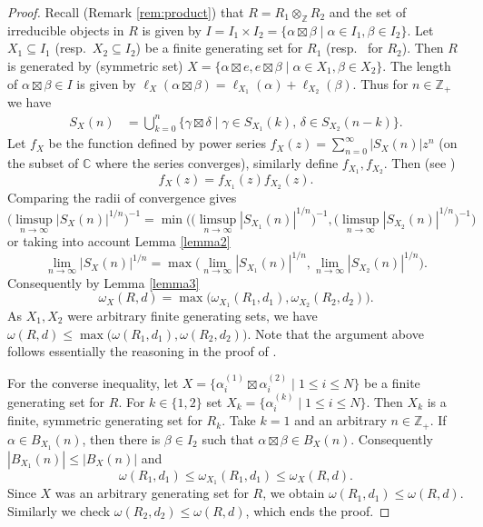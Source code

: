 \documentclass[11 pt, leqno]{amsart}
\newcommand{\CC}{\mathbb{C}}
\newcommand{\ZZ}{\mathbb{Z}}
\theoremstyle{definition}
\numberwithin{equation}{section}
\begin{document}
\begin{proof}
Recall (Remark \ref{rem:product}) that $R=R_1\otimes_{\ZZ} R_2$ and the set of irreducible objects in $R$ is given by $I=I_1\times I_2=\{\alpha\boxtimes \beta\mid \alpha\in I_1,\beta\in I_2\}$. Let $X_1\subseteq I_1$ (resp.~$X_2\subseteq I_2$) be a finite generating set for $R_1$ (resp.~ for $R_2$). Then $R$ is generated by (symmetric set) $X=\{\alpha\boxtimes e,e\boxtimes \beta\mid \alpha\in X_1,\beta\in X_2\}$.
The length of $\alpha\boxtimes\beta\in I$ is given by $\ell_X(\alpha\boxtimes\beta)=\ell_{X_1}(\alpha)+\ell_{X_2}(\beta)$. Thus for $n\in\ZZ_+$ we have
\[\begin{split}
S_X(n)&=
\bigcup_{k=0}^{n} \{\gamma\boxtimes\delta \;\big|\;
\gamma\in S_{X_1}(k), \,
\delta\in S_{X_2}(n-k)\bigr\}.
\end{split}\]
Let $f_X$ be the function defined by power series $f_X(z)=\sum_{n=0}^{\infty} |S_X(n)| z^n$ (on the subset of $\CC$ where the series converges), similarly define $f_{X_1},f_{X_2}$. Then (see \cite[Theorem 3.1]{BanicaVergnioux})
\[
f_X(z) = f_{X_1} (z) f_{X_2}(z).
\]
Comparing the radii of convergence \cite[Section 10.5]{RudinRC} gives
\[
\bigl(\limsup_{n\to\infty} |S_X(n)|^{1/n}\bigr)^{-1}=
\min \bigl(
\bigl(\limsup_{n\to\infty} |S_{X_1}(n)|^{1/n}\bigr)^{-1},
\bigl(\limsup_{n\to\infty} |S_{X_2}(n)|^{1/n}\bigr)^{-1}\bigr)
\]
or taking into account Lemma \ref{lemma2}
\[
\lim_{n\to\infty} |S_X(n)|^{1/n}=
\max \bigl(\lim_{n\to\infty} |S_{X_1}(n)|^{1/n},
\lim_{n\to\infty} |S_{X_2}(n)|^{1/n}\bigr).
\]
Consequently by Lemma \ref{lemma3}
\[
\omega_X(R,d)=
\max\bigl( 
\omega_{X_1}(R_1,d_1),
\omega_{X_2}(R_2,d_2)\bigr).
\]
As $X_1,X_2$ were arbitrary finite generating sets, we have  $
\omega(R,d)\le\max\bigl( \omega(R_1,d_1), \omega(R_2,d_2)\bigr)$. Note that the argument above follows essentially  the reasoning in the proof of \cite[Theorem 3.1]{BanicaVergnioux}.




For the converse inequality, let $X=\{\alpha_i^{(1)}\boxtimes\alpha^{(2)}_i\mid 1\le i \le N\}$ be a finite generating set for $R$. For $k\in \{1,2\}$ set $X_k=\{\alpha_i^{(k)}\mid 1\le i \le N\}$. Then $X_k$ is a finite, symmetric generating set for $R_k$. Take $k=1$ and an arbitrary $n\in\ZZ_+$. If $\alpha\in B_{X_1}(n)$, then there is $\beta\in I_2$ such that $\alpha\boxtimes \beta\in B_X(n)$. Consequently $|B_{X_1}(n)|\le |B_X(n)|$ and
\[
\omega(R_1,d_1)\le \omega_{X_1}(R_1,d_1)\le \omega_X(R,d).
\]
Since $X$ was an arbitrary generating set for $R$, we obtain $\omega(R_1,d_1)\le \omega(R,d)$. Similarly we check $\omega(R_2,d_2)\le \omega(R,d)$, which ends the proof.
\end{proof}
\end{document}
